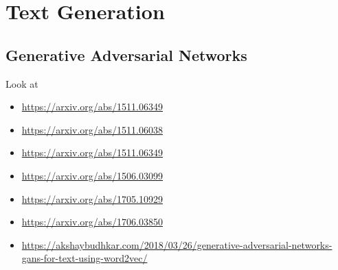\section{Text Generation}\label{introduction:text-generation}

\subsection{Generative Adversarial Networks}\label{introduction:text-generation:gans}


Look at
\begin{itemize}
    \item \url{https://arxiv.org/abs/1511.06349}
    \item \url{https://arxiv.org/abs/1511.06038}
    \item \url{https://arxiv.org/abs/1511.06349}
    \item \url{https://arxiv.org/abs/1506.03099}
    \item \url{https://arxiv.org/abs/1705.10929}
    \item \url{https://arxiv.org/abs/1706.03850}
    \item \url{https://akshaybudhkar.com/2018/03/26/generative-adversarial-networks-gans-for-text-using-word2vec/}
\end{itemize}
